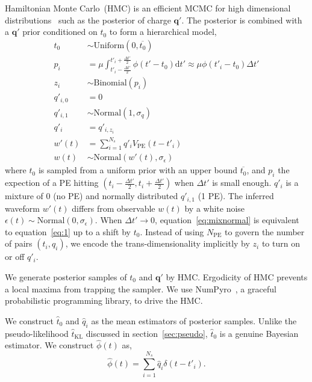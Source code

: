 Hamiltonian Monte Carlo~(HMC) is an efficient MCMC for high dimensional distributions~\cite{neal_mcmc_2012} such as the posterior of charge $\bm{q'}$. The posterior is combined with a $\bm{q'}$ prior conditioned on $t_0$ to form a hierarchical model, 
\begin{equation}
  \begin{aligned}
    t_{0} &\sim \mathrm{Uniform}(0, \overline{t_0}) \\
    p_i &= \mu \int_{t'_i-\frac{\Delta t'}{2}}^{t'_i+\frac{\Delta t'}{2}} \phi(t' - t_0)\mathrm{d}t' \approx \mu\phi(t'_i - t_0)\Delta{t'} \\
    z_i &\sim \mathrm{Binomial}(p_i) \\
    q'_{i,0}&=0\\
    q'_{i,1}& \sim \mathrm{Normal}(1, \sigma_q)\\
    q'_i &= q'_{i,z_i}\\
    w'(t) & = \sum_{i=1}^{N_s}q'_iV_\mathrm{PE}(t-t'_i)\\
    w(t) &\sim \mathrm{Normal}(w'(t), \sigma_\epsilon)
  \end{aligned}
  \label{eq:mixnormal}
\end{equation}
where $t_{0}$ is sampled from a uniform prior with an upper bound $\overline{t_{0}}$, and $p_i$ the expection of a PE hitting $(t_{i} - \frac{\Delta t'}{2}, t_{i} + \frac{\Delta t'}{2})$ when $\Delta t'$ is small enough. $q'_i$ is a mixture of 0 (no PE) and normally distributed $q'_{i,1}$ (1 PE). The inferred waveform $w'(t)$ differs from observable $w(t)$ by a white noise $\epsilon(t) \sim \mathrm{Normal}(0, \sigma_\epsilon)$. When $\Delta{t'} \to 0$, equation~\eqref{eq:mixnormal} is equivalent to equation~\eqref{eq:1} up to a shift by $t_0$. Instead of using $N_\mathrm{PE}$ to govern the number of pairs $(t_i, q_i)$, we encode the trans-dimensionality implicitly by $z_i$ to turn on or off $q'_i$. 

We generate posterior samples of $t_0$ and $\bm{q'}$ by HMC. Ergodicity of HMC prevents a local maxima from trapping the sampler. We use NumPyro~\cite{phan2019composable}, a graceful probabilistic programming library, to drive the HMC. 

We construct $\hat{t}_0$ and $\hat{q}_i$ as the mean estimators of posterior samples. Unlike the pseudo-likelihood $\hat{t}_\mathrm{KL}$ discussed in section~\ref{sec:pseudo}, $\hat{t}_0$ is a genuine Bayesian estimator. We construct $\hat{\phi}(t)$ as, 
\begin{equation}
  \label{eq:mcmc-phi}
  \hat{\phi}(t) = \sum_{i=1}^{N_s}\hat{q}_i\delta(t-t'_i).
\end{equation}

